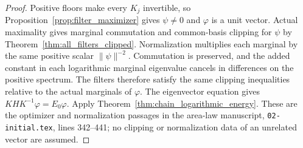 \begin{proof}\leanok
    Positive floors make every $K_j$ invertible, so
    Proposition~\ref{prop:filter_maximizer} gives $\psi\ne0$ and
    $\varphi$ is a unit vector. Actual maximality gives marginal
    commutation and common-basis clipping for $\psi$ by
    Theorem~\ref{thm:all_filters_clipped}. Normalization multiplies
    each marginal by the same positive scalar
    $\lVert\psi\rVert^{-2}$. Commutation is preserved, and the
    added constant in each logarithmic marginal eigenvalue cancels
    in differences on the positive spectrum. The filters therefore
    satisfy the same clipping inequalities relative to the actual
    marginals of $\varphi$. The eigenvector equation gives
    $KHK^{-1}\varphi=E_0\varphi$. Apply
    Theorem~\ref{thm:chain_logarithmic_energy}. These are the
    optimizer and normalization passages in the area-law manuscript,
    \texttt{02-initial.tex}, lines 342--441; no clipping or
    normalization data of an unrelated vector are assumed.
\end{proof}

